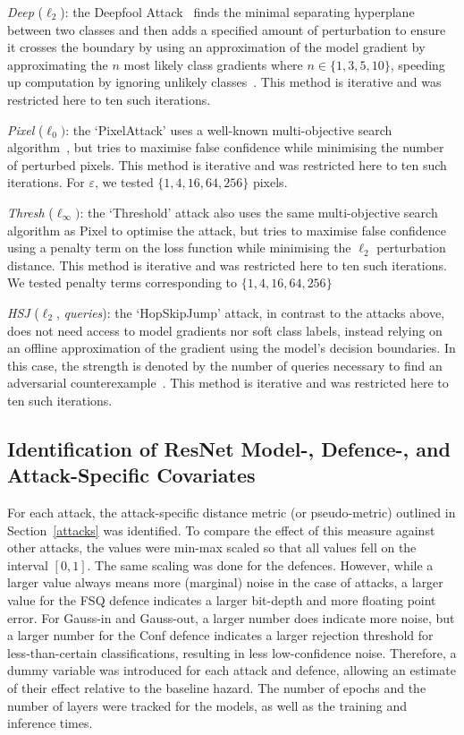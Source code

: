 \textit{Deep} ($\ell_2$): the Deepfool Attack~\cite{deepfool} finds the minimal separating hyperplane between two classes and then adds a specified amount of perturbation to ensure it crosses the boundary by using an approximation of the model gradient by approximating the $n$ most likely class gradients where $n \in \{1,3,5,10\}$, speeding up computation by ignoring unlikely classes~\cite{deepfool}. This method is iterative and was restricted here to ten such iterations.

\textit{Pixel} ($\ell_{0})$: the `PixelAttack' uses a well-known multi-objective search algorithm~\cite{pixelattack}, but tries to maximise false confidence while minimising the number of perturbed pixels. This method is iterative and was restricted here to ten such iterations. For $\varepsilon$, we tested $\{
1,4,16,64,256
\}$ pixels.

\textit{Thresh} ($\ell_{\infty})$: the `Threshold' attack also uses the same multi-objective search algorithm as Pixel to optimise the attack, but tries to maximise false confidence using a penalty term on the loss function while minimising the $\ell_2$ perturbation distance. This method is iterative and was restricted here to ten such iterations. We tested penalty terms corresponding to $\{ 1,4,16,64,256\}$





\textit{HSJ} ($\ell_2$, \textit{queries}): the `HopSkipJump' attack, in contrast to the attacks above, does not need access to model gradients nor soft class labels, instead relying on an offline approximation of the gradient using the model's decision boundaries. In this case, the strength is denoted by the number of queries necessary to find an adversarial counterexample~\cite{hopskipjump}. This method is iterative and was restricted here to ten such iterations.



\subsection{Identification of ResNet Model-, Defence-, and Attack-Specific Covariates}

For each attack, the attack-specific distance metric (or pseudo-metric) outlined in Section~\ref{attacks} was identified. To compare the effect of this measure against other attacks, the values were min-max scaled so that all values fell on the interval $[0,1]$. The same scaling was done for the defences. However, while a larger value always means more (marginal) noise in the case of attacks, a larger value for the FSQ defence indicates a larger bit-depth and more floating point error. For Gauss-in and Gauss-out, a larger number does indicate more noise, but a larger number for the Conf defence indicates a larger rejection threshold for less-than-certain classifications, resulting in less low-confidence noise. Therefore, a dummy variable was introduced for each attack and defence, allowing an estimate of their effect relative to the baseline hazard. The number of epochs and the number of layers were tracked for the models, as well as the training and inference times.



